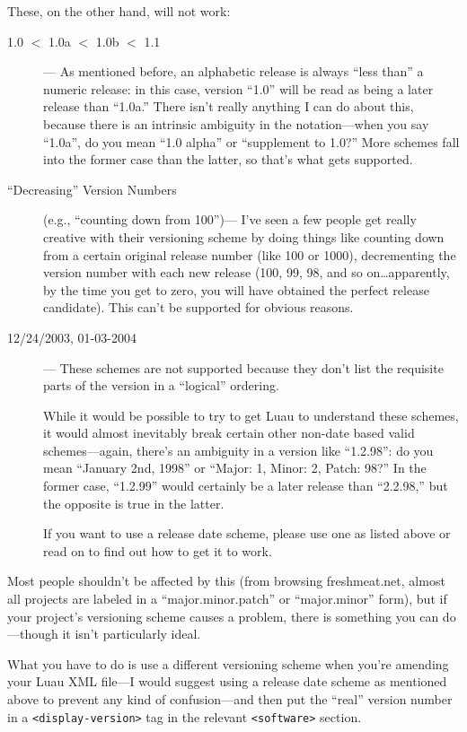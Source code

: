 \documentclass{report}
\begin{document}
These, on the other hand, will not work:

\begin{description}
\item[1.0 $<$ 1.0a $<$ 1.0b $<$ 1.1]--- As mentioned before, an alphabetic release is always ``less than'' a numeric release: in this case, version ``1.0'' will be read as being a later release than ``1.0a.''  There isn't really anything I can do about this, because there is an intrinsic ambiguity in the notation---when you say ``1.0a'', do you mean ``1.0 alpha'' or ``supplement to 1.0?''  More schemes fall into the former case than the latter, so that's what gets supported.

\item[``Decreasing'' Version Numbers] (e.g., ``counting down from 100'')--- I've seen a few people get really creative with their versioning scheme by doing things like counting down from a certain original release number (like 100 or 1000), decrementing the version number with each new release (100, 99, 98, and so on\ldots apparently, by the time you get to zero, you will have obtained the perfect release candidate).  This can't be supported for obvious reasons.

\item[12/24/2003, 01-03-2004]--- These schemes are not supported because they don't list the requisite parts of the version in a ``logical'' ordering.

While it would be possible to try to get Luau to understand these schemes, it would almost inevitably break certain other non-date based valid schemes---again, there's an ambiguity in a version like ``1.2.98'': do you mean ``January 2nd, 1998'' or ``Major: 1, Minor: 2, Patch: 98?''  In the former case, ``1.2.99'' would certainly be a later release than ``2.2.98,'' but the opposite is true in the latter.

If you want to use a release date scheme, please use one as listed above or read on to find out how to get it to work.
\end{description}

Most people shouldn't be affected by this (from browsing freshmeat.net, almost all projects are labeled in a ``major.minor.patch'' or ``major.minor'' form), but if your project's versioning scheme causes a problem, there is something you can do---though it isn't particularly ideal.

What you have to do is use a different versioning scheme when you're amending your Luau XML file---I would suggest using a release date scheme as mentioned above to prevent any kind of confusion---and then put the ``real'' version number in a \verb+<display-version>+ tag in the relevant \verb+<software>+ section.  
\end{document}
